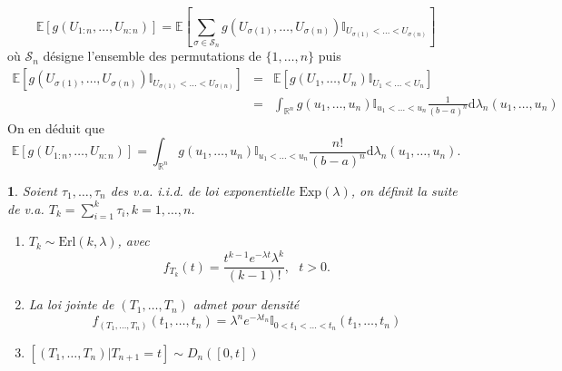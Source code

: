 \documentclass[8pt,notheorems]{beamer}
\newtheorem{prop}{\translate{Proposition}}
\theoremstyle{definition}
\theoremstyle{example}
\theoremstyle{mystyle}
\theoremstyle{plain}
\begin{document}
\begin{frame}[allowframebreaks]
$$
\mathbb{E}[g(U_{1:n},\ldots,U_{n:n})]=\mathbb{E}\left[\sum_{\sigma\in\mathcal{S}_n}
g(U_{\sigma(1)},\ldots,U_{\sigma(n)})
\mathbb{I}_{U_{\sigma(1)} <\ldots< U_{\sigma(n)}}
\right]
$$
où $\mathcal{S}_n$ désigne l'ensemble des permutations de $\{1,\ldots,n \}$ puis
\begin{eqnarray*}
\mathbb{E}\left[g(U_{\sigma(1)},\ldots,U_{\sigma(n)})
\mathbb{I}_{U_{\sigma(1)} <\ldots< U_{\sigma(n)}}
\right]&=& \mathbb{E}\left[g(U_{1},\ldots,U_{n})
\mathbb{I}_{U_{1} <\ldots< U_{n}}\right]\\
&=&\int_{\mathbb{R}^{n}}g(u_{1},\ldots,u_{n})
\mathbb{I}_{u_{1} <\ldots< u_{n}}\frac{1}{(b-a)^n}\text{d}\lambda_{n}(u_1,\ldots, u_n)
\end{eqnarray*}
On en déduit que
$$
\mathbb{E}[g(U_{1:n},\ldots,U_{n:n})]=\int_{\mathbb{R}^{n}}g(u_{1},\ldots,u_{n})
\mathbb{I}_{u_{1} <\ldots< u_{n}}\frac{n!}{(b-a)^n}\text{d}\lambda_{n}(u_1,\ldots, u_n).
$$
\begin{prop}
Soient $\tau_1,\ldots, \tau_n$ des v.a. i.i.d. de loi exponentielle $\text{Exp}(\lambda)$, on définit la suite de v.a. $T_k=\sum_{i=1}^{k}\tau_i, k=1,\ldots, n$.
\begin{enumerate}
\item $T_{k}\sim\text{Erl}(k,\lambda)$, avec
$$
f_{T_k}(t)=\frac{t^{k-1}e^{-\lambda t}\lambda^k}{(k-1)!},\text{ }t>0.
$$
\item La loi jointe de $(T_1,\ldots, T_n)$ admet pour densité
$$
f_{(T_1,\ldots, T_n)}(t_1,\ldots, t_n)=\lambda^n e^{-\lambda t_n }\mathbb{I}_{0<t_1<\ldots< t_n}(t_1,\ldots, t_n)
$$
\item $[(T_1,\ldots, T_n)|T_{n+1}=t]\sim D_{n}([0,t])$
\end{enumerate}
\end{prop}
\end{frame}
\end{document}

